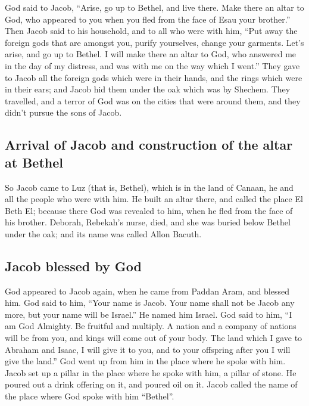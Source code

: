  God said to Jacob, ``Arise, go up to Bethel, and live
there. Make there an altar to God, who appeared to you when you fled
from the face of Esau your brother.''  Then Jacob said to
his household, and to all who were with him, ``Put away the foreign gods
that are amongst you, purify yourselves, change your garments.
 Let's arise, and go up to Bethel. I will make there an
altar to God, who answered me in the day of my distress, and was with me
on the way which I went.''  They gave to Jacob all the
foreign gods which were in their hands, and the rings which were in
their ears; and Jacob hid them under the oak which was by Shechem.
 They travelled, and a terror of God was on the cities
that were around them, and they didn't pursue the sons of Jacob.

\hypertarget{arrival-of-jacob-and-construction-of-the-altar-at-bethel}{%
\subsection{Arrival of Jacob and construction of the altar at
Bethel}\label{arrival-of-jacob-and-construction-of-the-altar-at-bethel}}

 So Jacob came to Luz (that is, Bethel), which is in the
land of Canaan, he and all the people who were with him. 
He built an altar there, and called the place El Beth El; because there
God was revealed to him, when he fled from the face of his brother.
 Deborah, Rebekah's nurse, died, and she was buried below
Bethel under the oak; and its name was called Allon Bacuth.

\hypertarget{jacob-blessed-by-god}{%
\subsection{Jacob blessed by God}\label{jacob-blessed-by-god}}

 God appeared to Jacob again, when he came from Paddan
Aram, and blessed him.  God said to him, ``Your name is
Jacob. Your name shall not be Jacob any more, but your name will be
Israel.'' He named him Israel.  God said to him, ``I am
God Almighty. Be fruitful and multiply. A nation and a company of
nations will be from you, and kings will come out of your body.
 The land which I gave to Abraham and Isaac, I will give
it to you, and to your offspring after you I will give the land.''
 God went up from him in the place where he spoke with
him.  Jacob set up a pillar in the place where he spoke
with him, a pillar of stone. He poured out a drink offering on it, and
poured oil on it.  Jacob called the name of the place
where God spoke with him ``Bethel''.

